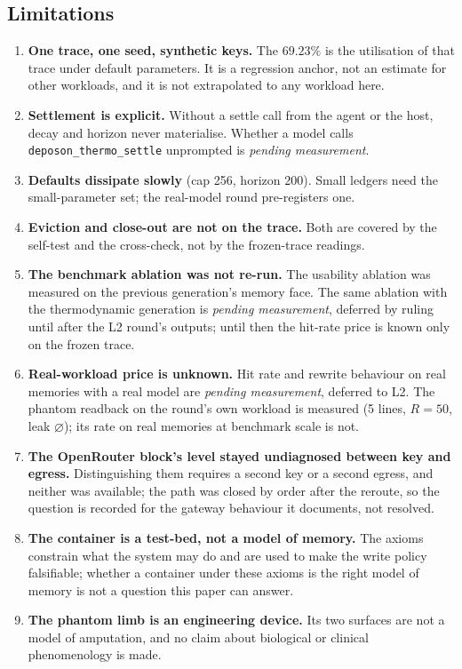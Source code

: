\documentclass[11pt,a4paper]{article}
\begin{document}
\subsection{Limitations}
\begin{enumerate}\setlength\itemsep{1pt}
\item \textbf{One trace, one seed, synthetic keys.} The $69.23\%$ is the utilisation of that trace under default parameters. It is a regression anchor, not an estimate for other workloads, and it is not extrapolated to any workload here.
\item \textbf{Settlement is explicit.} Without a settle call from the agent or the host, decay and horizon never materialise. Whether a model calls \texttt{deposon\_thermo\_settle} unprompted is \emph{pending measurement}.
\item \textbf{Defaults dissipate slowly} (cap 256, horizon 200). Small ledgers need the small-parameter set; the real-model round pre-registers one.
\item \textbf{Eviction and close-out are not on the trace.} Both are covered by the self-test and the cross-check, not by the frozen-trace readings.
\item \textbf{The benchmark ablation was not re-run.} The usability ablation was measured on the previous generation's memory face. The same ablation with the thermodynamic generation is \emph{pending measurement}, deferred by ruling until after the L2 round's outputs; until then the hit-rate price is known only on the frozen trace.
\item \textbf{Real-workload price is unknown.} Hit rate and rewrite behaviour on real memories with a real model are \emph{pending measurement}, deferred to L2. The phantom readback on the round's own workload is measured (5 lines, $R = 50$, leak $\varnothing$); its rate on real memories at benchmark scale is not.
\item \textbf{The OpenRouter block's level stayed undiagnosed between key and egress.} Distinguishing them requires a second key or a second egress, and neither was available; the path was closed by order after the reroute, so the question is recorded for the gateway behaviour it documents, not resolved.
\item \textbf{The container is a test-bed, not a model of memory.} The axioms constrain what the system may do and are used to make the write policy falsifiable; whether a container under these axioms is the right model of memory is not a question this paper can answer.
\item \textbf{The phantom limb is an engineering device.} Its two surfaces are not a model of amputation, and no claim about biological or clinical phenomenology is made.
\end{enumerate}
\end{document}
